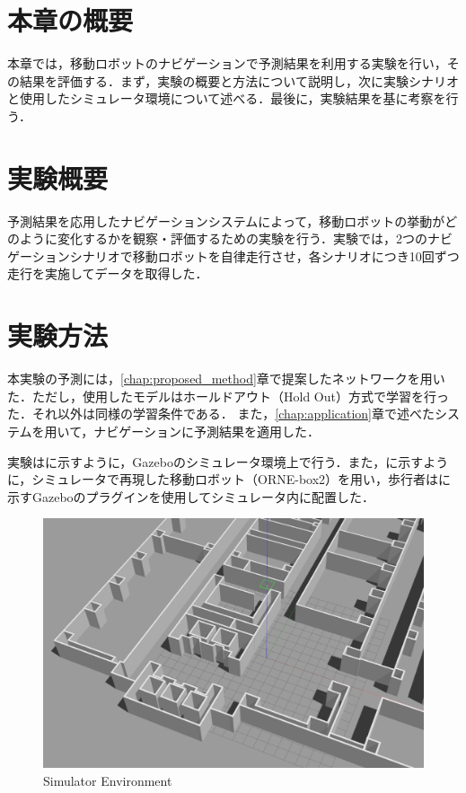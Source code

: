 

\section{本章の概要}
本章では，移動ロボットのナビゲーションで予測結果を利用する実験を行い，その結果を評価する．まず，実験の概要と方法について説明し，次に実験シナリオと使用したシミュレータ環境について述べる．最後に，実験結果を基に考察を行う．

\section{実験概要}
予測結果を応用したナビゲーションシステムによって，移動ロボットの挙動がどのように変化するかを観察・評価するための実験を行う．実験では，2つのナビゲーションシナリオで移動ロボットを自律走行させ，各シナリオにつき10回ずつ走行を実施してデータを取得した．

\section{実験方法}
本実験の予測には，\ref{chap:proposed_method}章で提案したネットワークを用いた．ただし，使用したモデルはホールドアウト（Hold Out）方式で学習を行った．それ以外は同様の学習条件である．
また，\ref{chap:application}章で述べたシステムを用いて，ナビゲーションに予測結果を適用した．

実験はに示すように，Gazebo\cite{Gazebo62:online}のシミュレータ環境上で行う．また，に示すように，シミュレータで再現した移動ロボット（ORNE-box2\cite{井口颯人2023屋外自律移動ロボットプラットフォーム-orne}）を用い，歩行者はに示すGazeboのプラグイン\cite{Actors-G87:online}を使用してシミュレータ内に配置した．

\begin{figure}[H]
  \centering
 \includegraphics[keepaspectratio, scale=0.15]
      {images/sim-env.png}
\caption{Simulator Environment}
 \label{Fig:sim-env}
\end{figure} 


